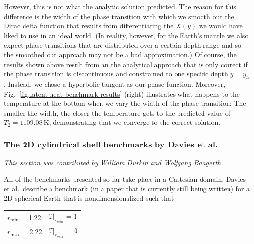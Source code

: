 \documentclass{article}
\begin{document}
However, this is not what the analytic solution
predicted. The reason for this difference is the width of the phase transition
with which we smooth out the Dirac delta function that results from
differentiating the $X(y)$ we would have liked to use in an ideal world.
(In reality, however, for the Earth's mantle we also expect phase transitions
that are distributed over a certain depth range and so the smoothed out
approach may not be a bad approximation.)
Of course, the results shown above result from an the analytical approach that
is only correct if the phase transition is discontinuous and constrained to one
specific depth $y=y_{tr}$. Instead, we chose a hyperbolic
tangent as our phase function. Moreover,
Fig.~\ref{fig:latent-heat-benchmark-results} (right) illustrates what happens to
the temperature at the bottom when we vary the width of the phase transition:
The smaller the width, the closer the temperature gets to the predicted value of
$T_2 = 1109.08 \, \text{K}$, demonstrating that we converge to the correct
solution.


\subsubsection{The 2D cylindrical shell benchmarks by Davies et al.}
\label{sec:benchmark-2D_cylindrical_shell}

\textit{This section was contributed by William Durkin and Wolfgang Bangerth.}

All of the benchmarks presented so far take place in a Cartesian domain. 
Davies et al.~describe a benchmark (in a paper that is currently still being
written) for a 2D spherical Earth that is  
nondimensionalized such that 
\begin{table}[h]
 \centering
 \begin{tabular}{ l l }
    $r_{\min}$ = 1.22 &  $\left. T \right|_{r_{min}}$ = 1 \\
    $r_{\max}$ = 2.22 &  $\left. T \right|_{r_{max}}$ = 0
 \end{tabular}
\end{table}
\end{document}
